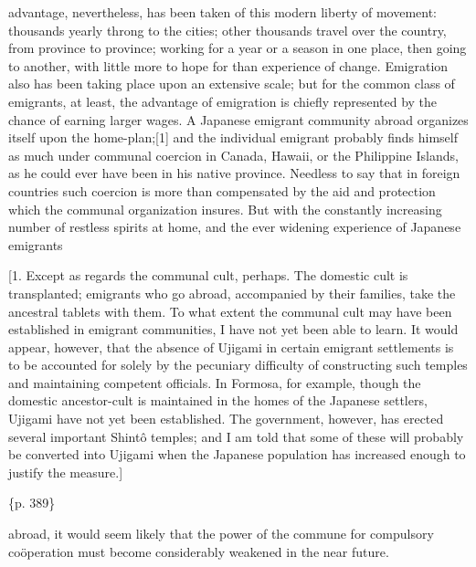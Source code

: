 advantage, nevertheless, has been taken of this modern liberty of movement: thousands yearly throng to the cities; other thousands travel over the country, from province to province; working for a year or a season in one place, then going to another, with little more to hope for than experience of change. Emigration also has been taking place upon an extensive scale; but for the common class of emigrants, at least, the advantage of emigration is chiefly represented by the chance of earning larger wages. A Japanese emigrant community abroad organizes itself upon the home-plan;[1] and the individual emigrant probably finds himself as much under communal coercion in Canada, Hawaii, or the Philippine Islands, as he could ever have been in his native province. Needless to say that in foreign countries such coercion is more than compensated by the aid and protection which the communal organization insures. But with the constantly increasing number of restless spirits at home, and the ever widening experience of Japanese emigrants

[1. Except as regards the communal cult, perhaps. The domestic cult is transplanted; emigrants who go abroad, accompanied by their families, take the ancestral tablets with them. To what extent the communal cult may have been established in emigrant communities, I have not yet been able to learn. It would appear, however, that the absence of Ujigami in certain emigrant settlements is to be accounted for solely by the pecuniary difficulty of constructing such temples and maintaining competent officials. In Formosa, for example, though the domestic ancestor-cult is maintained in the homes of the Japanese settlers, Ujigami have not yet been established. The government, however, has erected several important Shintô temples; and I am told that some of these will probably be converted into Ujigami when the Japanese population has increased enough to justify the measure.]

\{p. 389\}

abroad, it would seem likely that the power of the commune for compulsory coöperation must become considerably weakened in the near future.



